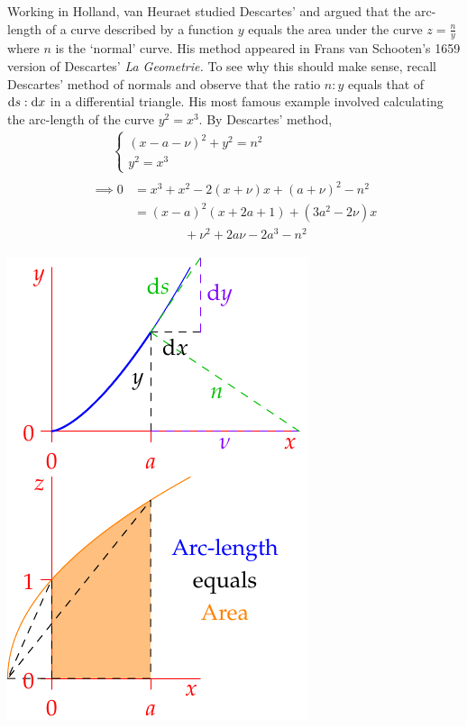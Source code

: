 \begin{minipage}[t]{0.64\linewidth}\vspace{0pt}
	 Working in Holland, van Heuraet studied Descartes' and argued that the arc-length of a curve described by a function $y$ equals the area under the curve $z=\frac ny$ where $n$ is the `normal' curve. His method appeared in Frans van Schooten's 1659 version of Descartes' \emph{La Geometrie.} To see why this should make sense, recall Descartes' method of normals and observe that the ratio $n:y$ equals that of ${\mathrm{d} s}:{\mathrm{d} x}$ in a differential triangle.\smallbreak
	His most famous example involved calculating the arc-length of the curve $y^2=x^3$. By Descartes' method,
	\begin{gather*}
		\qquad
		\begin{cases}
			(x-a-\nu)^2+y^2=n^2\\
			y^2=x^3
		\end{cases}\\
		\begin{aligned}
			\implies 0&= x^3+x^2-2(x+\nu)x+(a+\nu)^2-n^2\\
			&=(x-a)^2(x+2a+1)+(3a^2-2\nu)x\\
			&\qquad\qquad +\nu^2+2a\nu-2a^3-n^2
		\end{aligned}
	\end{gather*}
\end{minipage}
\hfill
\begin{minipage}[t]{0.35\linewidth}\vspace{-4pt}
	\flushright\includegraphics{calc-gregory}
\end{minipage}\medbreak


